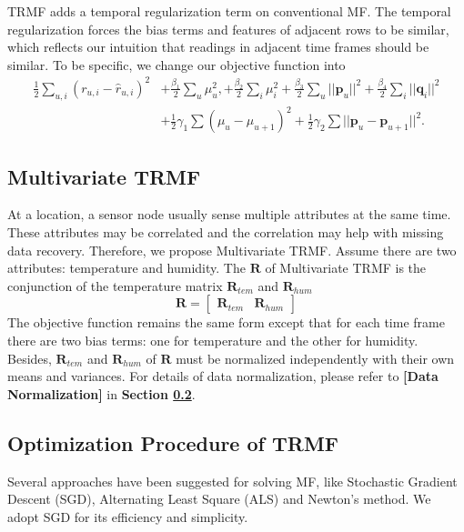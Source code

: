 TRMF adds a temporal regularization term on conventional MF. The temporal regularization forces the bias terms and features of adjacent rows to be similar, which reflects our intuition that readings in adjacent time frames should be similar. To be specific, we change our objective function into 
\begin{equation*}\begin{aligned} \frac{1}{2}\sum_{u,i}{(r_{u,i} - \hat{r}_{u,i})}^2 &+ \frac{\beta_1}{2}\sum_u{\mu_u^2}, + \frac{\beta_2}{2}\sum_i{\mu_i^2} + \frac{\beta_3}{2}\sum_u{||\mathbf{p}_u||^2} + \frac{\beta_4}{2}\sum_i{||\mathbf{q}_i||^2}\\ &+ \frac{1}{2}\gamma_1\sum{(\mu_u-\mu_{u+1})^2} + \frac{1}{2}\gamma_2\sum{||\mathbf{p}_u-\mathbf{p}_{u+1}||^2}.\end{aligned}\end{equation*}


\subsection{Multivariate TRMF}
At a location, a sensor node usually sense multiple attributes at the same time. These attributes may be correlated and the correlation may help with missing data recovery. Therefore, we propose Multivariate TRMF. Assume there are two attributes: temperature and humidity. The $\mathbf{R}$ of Multivariate TRMF is the conjunction of the temperature matrix $\mathbf{R}_{tem}$ and $\mathbf{R}_{hum}$
\begin{equation*} \mathbf{R} = \begin{bmatrix}\mathbf{R}_{tem} & \mathbf{R}_{hum} \end{bmatrix} \end{equation*}
The objective function remains the same form except that for each time frame there are two bias terms: one for temperature and the other for humidity. Besides, $\mathbf{R}_{tem}$ and $\mathbf{R}_{hum}$ of $\mathbf{R}$ must be normalized independently with their own means and variances. For details of data normalization, please refer to \textbf{[Data Normalization]} in \textbf{Section \ref{optimation_procedure}}.


\subsection{Optimization Procedure of TRMF}
\label{optimation_procedure}
Several approaches have been suggested for solving MF, like Stochastic Gradient Descent (SGD)\cite{koren2009matrix,chih2008large}, Alternating Least Square (ALS)\cite{koren2009matrix,zhou2008large} and Newton's method\cite{buchanan2005damped}. We adopt SGD for its efficiency and simplicity. 


